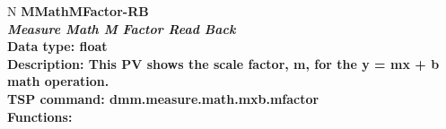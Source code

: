 \documentclass[openany]{article}
\begin{document}
		\begin{tabular}{N}
			\hline
			\bfseries MMathMFactor-RB\label{pv:mmathmfactor-rb} \\ \hline
			\emph{Measure Math M Factor Read Back} \\
			Data type: float \\
			Description: This PV shows the scale factor, m, for the y = mx + b math operation. \\
			TSP command: dmm.measure.math.mxb.mfactor \\
			Functions: \\
			\arrayrulecolor{\FuncTableBorderColor}

		\end{tabular}
\end{document}
